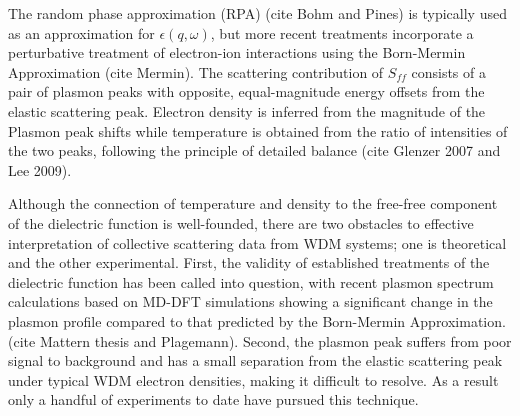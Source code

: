 \documentclass [11pt, proquest, article] {uwthesis}[2016/11/22]
\begin{document}
The random phase approximation (RPA) (cite Bohm and Pines) is typically used as an approximation for $\epsilon(q, \omega)$, but more recent treatments incorporate a perturbative treatment of electron-ion interactions using the Born-Mermin Approximation (cite Mermin). 
The scattering contribution of $S_{ff}$ consists of a pair of plasmon peaks with opposite, equal-magnitude energy offsets from the elastic scattering peak. Electron density is inferred from the magnitude of the Plasmon peak shifts while temperature is obtained from the ratio of intensities of the two peaks, following the principle of detailed balance (cite Glenzer 2007 and Lee 2009).

Although the connection of temperature and density to the free-free component of the dielectric function is well-founded, there are two obstacles to effective interpretation of collective scattering data from WDM systems; one is theoretical and the other experimental. First, the validity of established treatments of the dielectric function has been called into question, with recent plasmon spectrum calculations based on MD-DFT simulations showing a significant change in the plasmon profile compared to that predicted by the Born-Mermin Approximation. (cite Mattern thesis and Plagemann). Second, the plasmon peak suffers from poor signal to background and has a small separation from the elastic scattering peak under typical WDM electron densities, making it difficult to resolve. As a result only a handful of experiments to date have pursued this technique. 
\end{document}
